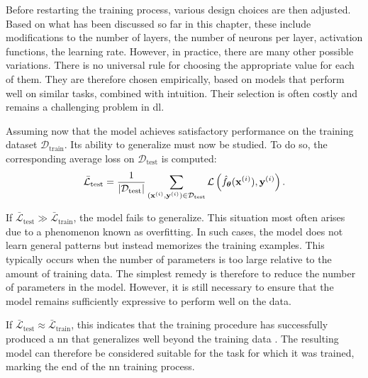 Before restarting the training process, various design choices are then adjusted.
Based on what has been discussed so far in this chapter, these include modifications to the number of layers, the number of neurons per layer, activation functions, the learning rate.
However, in practice, there are many other possible variations.
There is no universal rule for choosing the appropriate value for each of them.
They are therefore chosen empirically, based on models that perform well on similar tasks, combined with intuition.
Their selection is often costly and remains a challenging problem in \gls{dl}.

Assuming now that the model achieves satisfactory performance on the training dataset $\mathcal{D}_{\mathrm{train}}$.
Its ability to generalize must now be studied.
To do so, the corresponding average loss on $\mathcal{D}_{\mathrm{test}}$ is computed:
\begin{equation}
\bar{\mathcal{L}}_{\mathrm{test}} = \frac{1}{|\mathcal{D}_{\mathrm{test}}|} \sum_{(\mathbf{x}^{(i)}, \mathbf{y}^{(i)}) \in \mathcal{D}_{\mathrm{test}}} \mathcal{L}\left(\hat{f}_{\boldsymbol{\theta}}(\mathbf{x}^{(i)}), \mathbf{y}^{(i)}\right).
\label{eq:test_loss}
\end{equation}

If $\bar{\mathcal{L}}_{\mathrm{test}} \gg \bar{\mathcal{L}}_{\mathrm{train}}$, the model fails to generalize.
This situation most often arises due to a phenomenon known as overfitting.
In such cases, the model does not learn general patterns but instead memorizes the training examples.
This typically occurs when the number of parameters is too large relative to the amount of training data.
The simplest remedy is therefore to reduce the number of parameters in the model.
However, it is still necessary to ensure that the model remains sufficiently expressive to perform well on the data.

If $\bar{\mathcal{L}}_{\mathrm{test}} \approx \bar{\mathcal{L}}_{\mathrm{train}}$, this indicates that the training procedure has successfully produced a \gls{nn} that generalizes well beyond the training data \parencite{Kawaguchi_2022}.
The resulting model can therefore be considered suitable for the task for which it was trained, marking the end of the \gls{nn} training process.
